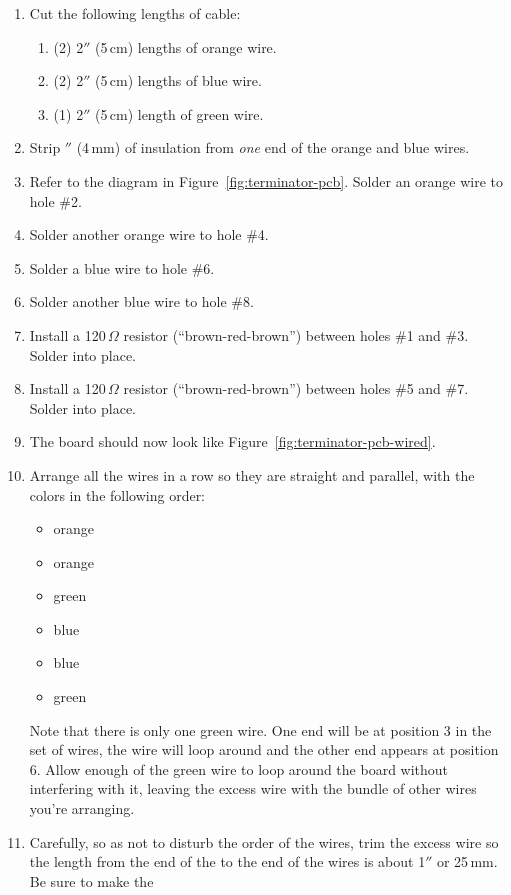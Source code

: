 \documentclass[letterpaper,twoside,onecolumn,openright,final]{memoir}
\begin{document}
\begin{enumerate}
\item	Cut the following lengths of  cable:
	\begin{enumerate}
	\item	(2) 2$''$ (5\,cm) lengths of orange wire.
	\item	(2) 2$''$ (5\,cm) lengths of blue wire.
	\item	(1) 2$''$ (5\,cm) length of green wire.
	\end{enumerate}
\item	Strip $''$ (4\,mm) of insulation from \emph{one} end of the orange and blue
	wires.
\item	Refer to the diagram in Figure~\ref{fig:terminator-pcb}.  Solder an orange wire to 
	hole \#2.
\item	Solder another orange wire to hole \#4.
\item	Solder a blue wire to hole \#6.
\item	Solder another blue wire to hole \#8.
\item	Install a 120\,$\Omega$ resistor (``brown-red-brown'') between holes \#1 and \#3.  Solder
	into place.
\item	Install a 120\,$\Omega$ resistor (``brown-red-brown'') between holes \#5 and \#7.  Solder
	into place.
\item 	The board should now look like Figure~\ref{fig:terminator-pcb-wired}.
\item	Arrange all the wires in a row so they are straight and parallel, with the colors in
	the following order:
	\begin{itemize}
	\item	orange
	\item	orange
	\item	green
	\item	blue
	\item	blue
	\item	green
	\end{itemize}
	Note that there is only one green wire.  One end will be at position 3 in the set of wires,
	the wire will loop around and the other end appears at position 6.  Allow enough of the green
	wire to loop around the board without interfering with it, leaving the excess wire with the
	bundle of other wires you're arranging.
\item	Carefully, so as not to disturb the order of the wires, trim the excess wire so the length from the
	end of the  to the end of the wires is about 1$''$ or 25\,mm.  Be sure to make the 

\end{enumerate}
\end{document}
